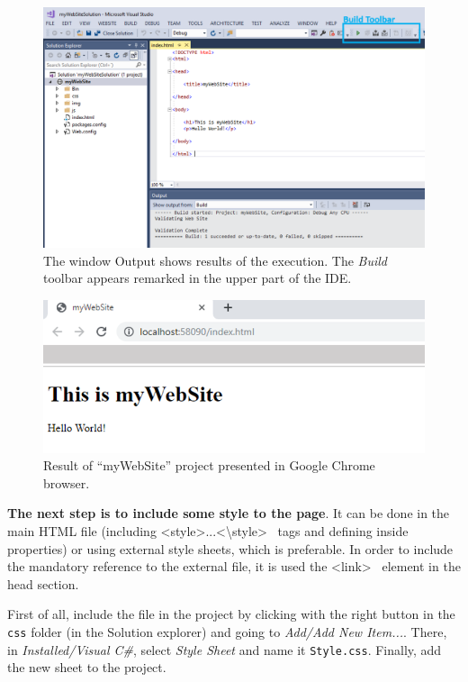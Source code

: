 \begin{figure}
    \centering
    \includegraphics[width= 0.9 \textwidth]{Figures/Projects/pro7}
    \caption{The window Output shows results of the execution. The \textit{Build} toolbar appears remarked in the upper part of the IDE.}
    \label{fig:pro7}
\end{figure}

\begin{figure}
    \centering
    \includegraphics[width= 0.9 \textwidth]{Figures/Projects/pro8}
    \caption{Result of ``myWebSite'' project presented in Google Chrome browser.}
    \label{fig:pro8}
\end{figure}

\FloatBarrier
\textbf{The next step is to include some style to the page}. It can be done in the main HTML file (including \textless style\textgreater...\textless\textbackslash style\textgreater ~ tags and defining inside properties) or using external style sheets, which is preferable. In order to include the mandatory reference to the external file, it is used the \textless link\textgreater ~  element in the head section.

First of all, include the file in the project by clicking with the right button in the \texttt{css} folder (in the Solution explorer) and going to \textit{Add/Add New Item...}. There, in \textit{Installed/Visual C\#}, select \textit{Style Sheet} and name it \texttt{Style.css}. Finally, add the new sheet to the project. 

